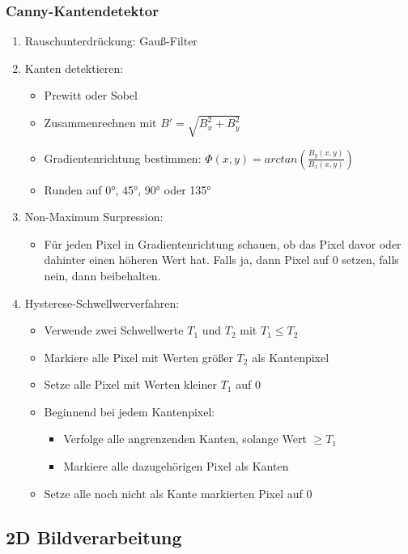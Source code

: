 \subsubsection*{Canny-Kantendetektor}
\begin{enumerate}
\item Rauschunterdrückung: Gauß-Filter
\item Kanten detektieren:
	\begin{itemize}
	\item Prewitt oder Sobel
	\item Zusammenrechnen mit \(B' = \sqrt{B_x^2 + B_y^2}\)
	\item Gradientenrichtung bestimmen: \(\Phi(x,y) = arctan\left(\frac{B_y(x,y)}{B_x(x,y)}\right)\)
	\item Runden auf 0°, 45°, 90° oder 135°
	\end{itemize}
\item Non-Maximum Surpression:
	\begin{itemize}
	\item Für jeden Pixel in Gradientenrichtung schauen, ob das Pixel davor oder dahinter einen höheren Wert hat. Falls ja, dann Pixel auf 0 setzen, falls nein, dann beibehalten.
	\end{itemize}
\item Hysterese-Schwellwerverfahren:
	\begin{itemize}
	\item Verwende zwei Schwellwerte \(T_1\) und \(T_2\) mit \(T_1 \leq T_2\)
	\item Markiere alle Pixel mit Werten größer \(T_2\) als Kantenpixel
	\item Setze alle Pixel mit Werten kleiner \(T_1\) auf 0
	\item Beginnend bei jedem Kantenpixel:
		\begin{itemize}
		\item Verfolge alle angrenzenden Kanten, solange Wert \(\geq T_1\)
		\item Markiere alle dazugehörigen Pixel als Kanten
		\end{itemize}
	\item Setze alle noch nicht als Kante markierten Pixel auf 0
	\end{itemize}
\end{enumerate}


\subsection{2D Bildverarbeitung}

